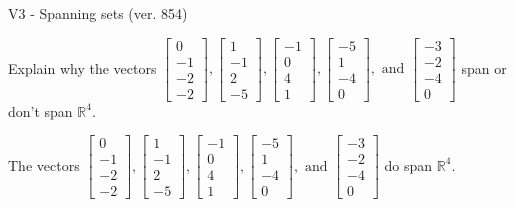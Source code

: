 \begin{exercise}
  \begin{exerciseTitle}V3 - Spanning sets (ver. 854)\end{exerciseTitle}
  \begin{exerciseStatement}
    Explain why the vectors \(\left[\begin{array}{r}
0 \\
-1 \\
-2 \\
-2
\end{array}\right] , \left[\begin{array}{r}
1 \\
-1 \\
2 \\
-5
\end{array}\right] , \left[\begin{array}{r}
-1 \\
0 \\
4 \\
1
\end{array}\right] , \left[\begin{array}{r}
-5 \\
1 \\
-4 \\
0
\end{array}\right] , \text{ and } \left[\begin{array}{r}
-3 \\
-2 \\
-4 \\
0
\end{array}\right]\) span or don't span \(\mathbb{R}^4\). 
	


  \end{exerciseStatement}
  \begin{exerciseAnswer}
   The vectors \(\left[\begin{array}{r}
0 \\
-1 \\
-2 \\
-2
\end{array}\right] , \left[\begin{array}{r}
1 \\
-1 \\
2 \\
-5
\end{array}\right] , \left[\begin{array}{r}
-1 \\
0 \\
4 \\
1
\end{array}\right] , \left[\begin{array}{r}
-5 \\
1 \\
-4 \\
0
\end{array}\right] , \text{ and } \left[\begin{array}{r}
-3 \\
-2 \\
-4 \\
0
\end{array}\right]\) 
  	 do  
	span \(\mathbb{R}^4\).
  



\end{exerciseAnswer}
\end{exercise}
